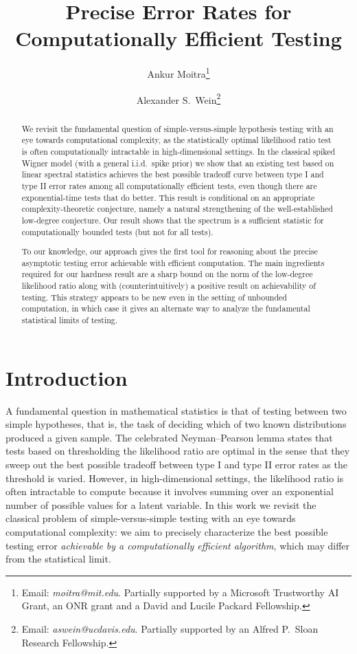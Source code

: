 \documentclass[11pt]{article}
\author[1,2]{Ankur Moitra\thanks{Email: \textit{moitra@mit.edu}. Partially supported by a Microsoft Trustworthy AI Grant, an ONR grant and a David and Lucile Packard Fellowship.}}
\author[3]{Alexander S.\ Wein\thanks{Email: \textit{aswein@ucdavis.edu}. Partially supported by an Alfred P.\ Sloan Research Fellowship.}}
\affil[1]{Department of Mathematics, MIT}
\affil[2]{Computer Science and Artificial Intelligence Lab, MIT}
\affil[3]{Department of Mathematics, UC Davis}
\date{}
\title{Precise Error Rates for Computationally Efficient Testing}
\begin{document}
\maketitle

\begin{abstract}
We revisit the fundamental question of simple-versus-simple hypothesis testing with an eye towards computational complexity, as the statistically optimal likelihood ratio test is often computationally intractable in high-dimensional settings. In the classical spiked Wigner model (with a general i.i.d.\ spike prior) we show that an existing test based on linear spectral statistics achieves the best possible tradeoff curve between type I and type II error rates among all computationally efficient tests, even though there are exponential-time tests that do better. This result is conditional on an appropriate complexity-theoretic conjecture, namely a natural strengthening of the well-established low-degree conjecture. Our result shows that the spectrum is a sufficient statistic for computationally bounded tests (but not for all tests).

To our knowledge, our approach gives the first tool for reasoning about the precise asymptotic testing error achievable with efficient computation. The main ingredients required for our hardness result are a sharp bound on the norm of the low-degree likelihood ratio along with (counterintuitively) a positive result on achievability of testing. This strategy appears to be new even in the setting of unbounded computation, in which case it gives an alternate way to analyze the fundamental statistical limits of testing.
\end{abstract}




\newpage


\section{Introduction}

A fundamental question in mathematical statistics is that of testing between two simple hypotheses, that is, the task of deciding which of two known distributions produced a given sample. The celebrated Neyman--Pearson lemma states that tests based on thresholding the likelihood ratio are optimal in the sense that they sweep out the best possible tradeoff between type I and type II error rates as the threshold is varied. However, in high-dimensional settings, the likelihood ratio is often intractable to compute because it involves summing over an exponential number of possible values for a latent variable. In this work we revisit the classical problem of simple-versus-simple testing with an eye towards computational complexity: we aim to precisely characterize the best possible testing error \emph{achievable by a computationally efficient algorithm}, which may differ from the statistical limit.
\end{document}
